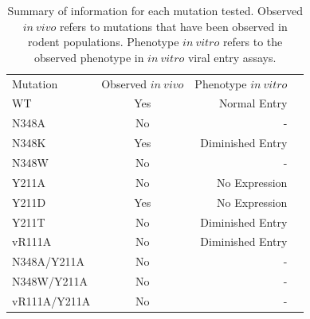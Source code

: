 \documentclass[12pt]{article}
\begin{document}
\clearpage
\begin {table}[H]
\caption{\label{tab:summary_mutant}Summary of information for each mutation tested. Observed $in~vivo$ refers to mutations that have been observed in rodent populations. Phenotype $in~vitro$ refers to the observed phenotype in $in~vitro$ viral entry assays.}
\begin{center}
  \resizebox{11cm}{!} {
    \begin{tabular}{l c r r}
    \hline
      Mutation & Observed $in~vivo$ & Phenotype $in~vitro$ \\%
            WT &                Yes &         Normal Entry \\%
         N348A &                 No &                    - \\%
         N348K &                Yes &     Diminished Entry \\%
         N348W &                 No &                    - \\%
         Y211A &                 No &        No Expression \\%
         Y211D &                Yes &        No Expression \\%
         Y211T &                 No &     Diminished Entry \\%
        vR111A &                 No &     Diminished Entry \\%
   N348A/Y211A &                 No &                    - \\%
   N348W/Y211A &                 No &                    - \\%
  vR111A/Y211A &                 No &                    - \\%
    \hline
    \end{tabular}
  }
\end{center}
\end{table}
\end{document}
